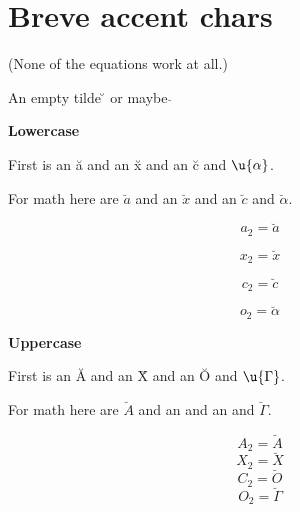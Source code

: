 \documentclass{article}
\begin{document}


\section{Breve accent chars}

(None of the equations work at all.)

An empty tilde \u{} or maybe $\breve{}$

\textbf{Lowercase}

First is an \u{a} and an \u{x} and an \u{c} and $\u{\alpha}$.

For math here are $\breve{a}$ and an $\breve{x}$ and an $\breve{c}$ and $\breve{\alpha}$.

$$a_2=\breve{a}$$

$$x_2=\breve{x}$$

$$c_2=\breve{c}$$

$$o_2=\breve{\alpha}$$

\textbf{Uppercase}

First is an \u{A} and an \u{X} and an \u{O} and $\u{\Gamma}$.

For math here are $\breve{A}$ and an  and an  and $\breve{\Gamma}$.

$$A_2=\breve{A}$$
$$X_2=\breve{X}$$
$$C_2=\breve{O}$$
$$O_2=\breve{\Gamma}$$
\end{document}
